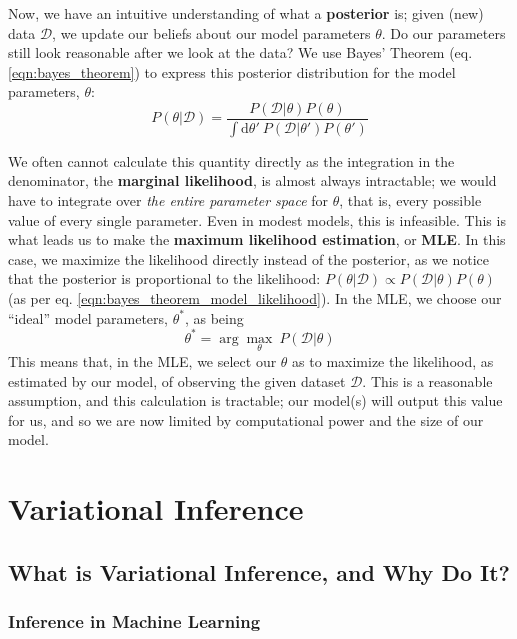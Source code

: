 \documentclass[]{article}
\begin{document}
Now, we have an intuitive understanding of what a \textbf{posterior} is; given (new) data $\mathcal{D}$, we update our beliefs about our model parameters $\theta$. Do our parameters still look reasonable after we look at the data? We use Bayes' Theorem (eq. \ref{eqn:bayes_theorem}) to express this posterior distribution for the model parameters, $\theta$:
\begin{equation}\label{eqn:bayes_theorem_model_likelihood}
    P(\theta | \mathcal{D}) = \frac{P(\mathcal{D} | \theta) P(\theta)}{\int \text{d}\theta'~ P(\mathcal{D} | \theta') P(\theta')}
\end{equation}

We often cannot calculate this quantity directly as the integration in the denominator, the \textbf{marginal likelihood}, is almost always intractable; we would have to integrate over \textit{the entire parameter space} for $\theta$, that is, every possible value of every single parameter. Even in modest models, this is infeasible. This is what leads us to make the \textbf{maximum likelihood estimation}, or \textbf{MLE}. In this case, we maximize the likelihood directly instead of the posterior, as we notice that the posterior is proportional to the likelihood: $P(\theta | \mathcal{D}) \propto P(\mathcal{D} |\theta) P(\theta)$ (as per eq. \ref{eqn:bayes_theorem_model_likelihood}). In the MLE, we choose our ``ideal'' model parameters, $\theta^*$, as being
\begin{equation}
    \theta^* = \arg\max_\theta ~ P(\mathcal{D} | \theta)
\end{equation}
This means that, in the MLE, we select our $\theta$ as to maximize the likelihood, as estimated by our model, of observing the given dataset $\mathcal{D}$. This is a reasonable assumption, and this calculation is tractable; our model(s) will output this value for us, and so we are now limited by computational power and the size of our model.

\section{Variational Inference}

\subsection{What is Variational Inference, and Why Do It?}

\subsubsection{Inference in Machine Learning}
\end{document}
